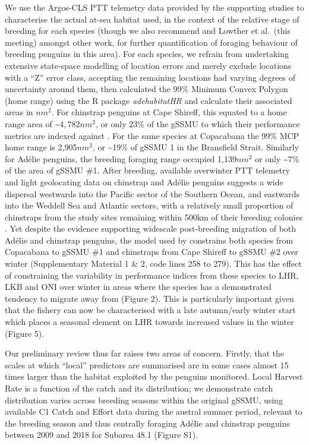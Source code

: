 \documentclass[]{elsarticle} %
\begin{document}
We use the Argos-CLS PTT telemetry data provided by the supporting
studies to characterise the actual at-sea habitat used, in the context
of the relative stage of breeding for each species (though we also
recommend \citet{Warwick-Evans2018} and Lowther et al.~(this meeting)
amongst other work, for further quantification of foraging behaviour of
breeding penguins in this area). For each species, we refrain from
undertaking extensive state-space modelling of location errors and
merely exclude locations with a ``Z'' error class, accepting the
remaining locations had varying degrees of uncertainty around them, then
calculated the 99\% Minimum Convex Polygon (home range) using the R
package \emph{adehabitatHR} and calculate their associated areas in
\(nm^2\). For chinstrap penguins at Cape Shireff, this equated to a home
range area of \textasciitilde{}\(4,782nm^2\), or only 23\% of the gSSMU
to which their performance metrics are indexed against
\citep{Watters2020}. For the same species at Copacabana the 99\% MCP
home range is 2,905\(nm^2\), or \textasciitilde19\% of gSSMU 1 in the
Bransfield Strait. Similarly for Adélie penguins, the breeding foraging
range occupied 1,139\(nm^2\) or only \textasciitilde7\% of the area of
gSSMU \#1. After breeding, available overwinter PTT telemetry and light
geolocating data on chinstrap and Adélie penguins suggests a wide
dispersal westwards into the Pacific sector of the Southern Ocean, and
eastwards into the Weddell Sea and Atlantic sectors, with a relatively
small proportion of chinstraps from the study sites remaining within
500km of their breeding colonies \citep{Hinke2019}. Yet despite the
evidence supporting widescale post-breeding migration of both Adélie and
chinstrap penguins, the model used by \citet{Watters2020} constrains
both species from Copacabana to gSSMU \#1 and chinstraps from Cape
Shireff to gSSMU \#2 over winter (Supplementary Material 1 \& 2, code
lines 258 to 279). This has the effect of constraining the variability
in performance indices from these species to LHR, LKB and ONI over
winter in areas where the species has a demonstrated tendency to migrate
away from (Figure 2). This is particularly important given that the
fishery can now be characterised with a late autumn/early winter start
which places a seasonal element on LHR towards increased values in the
winter (Figure 5).

Our preliminary review thus far raises two areas of concern. Firstly,
that the scales at which ``local'' predictors are summarised are in some
cases almost 15 times larger than the habitat exploited by the penguins
monitored. Local Harvest Rate is a function of the catch and its
distribution; we demonstrate catch distribution varies across breeding
seasons within the original gSSMU, using available C1 Catch and Effort
data during the austral summer period, relevant to the breeding season
and thus centrally foraging Adélie and chinstrap penguins between 2009
and 2018 for Subarea 48.1 (Figure S1).
\end{document}
